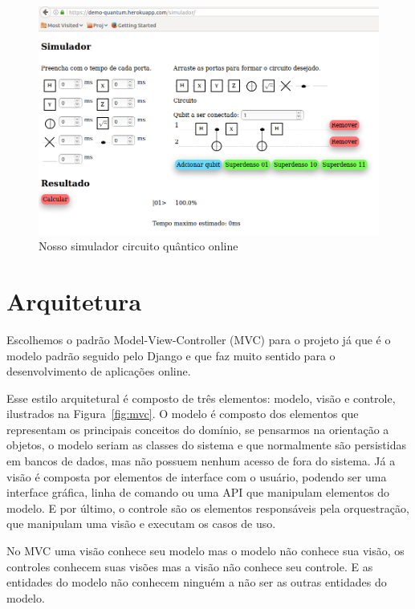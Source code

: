 \documentclass[a4paper, 12pt, oneside]{book}
\begin{document}
\begin{figure}[H]
\centering
\includegraphics[scale=0.5]{simulador-pagina.png}
\caption{Nosso simulador circuito quântico online}
\label{fig:simulador}
\end{figure}

\section{Arquitetura}

Escolhemos o padrão Model-View-Controller (MVC) para o projeto já que é o modelo padrão seguido pelo Django e que faz muito sentido para o desenvolvimento de aplicações online.

Esse estilo arquitetural é composto de três elementos: modelo, visão e controle, ilustrados na Figura~\ref{fig:mvc}. O modelo é composto dos elementos que representam os principais conceitos do domínio, se pensarmos na orientação a objetos, o modelo seriam as classes do sistema e que normalmente são persistidas em bancos de dados, mas não possuem nenhum acesso de fora do sistema. Já a visão é composta por elementos de interface com o usuário, podendo ser uma interface gráfica, linha de comando ou uma API que manipulam elementos do modelo. E por último, o controle são os elementos responsáveis pela orquestração, que manipulam uma visão e executam os casos de uso.

No MVC uma visão conhece seu modelo mas o modelo não conhece sua visão, os controles conhecem suas visões mas a visão não conhece seu controle. E as entidades do modelo não conhecem ninguém a não ser as outras entidades do modelo.
\end{document}
